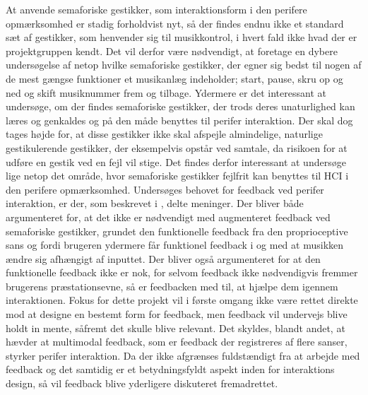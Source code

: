 At anvende semaforiske gestikker, som interaktionsform i den perifere opmærksomhed er stadig forholdvist nyt, så der findes endnu ikke et standard sæt af gestikker, som henvender sig til musikkontrol, i hvert fald ikke hvad der er projektgruppen kendt. Det vil derfor være nødvendigt, at foretage en dybere undersøgelse af netop hvilke semaforiske gestikker, der egner sig bedst til nogen af de mest gængse funktioner et musikanlæg indeholder; start, pause, skru op og ned og skift musiknummer frem og tilbage. Ydermere er det interessant at undersøge, om der findes semaforiske gestikker, der trods deres unaturlighed kan læres og genkaldes og på den måde benyttes til perifer interaktion. Der skal dog tages højde for, at disse gestikker ikke skal afspejle almindelige, naturlige gestikulerende gestikker, der eksempelvis opstår ved samtale, da risikoen for at udføre en gestik ved en fejl vil stige. Det findes derfor interessant at undersøge lige netop det område, hvor semaforiske gestikker fejlfrit kan benyttes til HCI i den perifere opmærksomhed. \blankline
%
Undersøges behovet for feedback ved perifer interaktion, er der, som beskrevet i , delte meninger. Der bliver både argumenteret for, at det ikke er nødvendigt med augmenteret feedback ved semaforiske gestikker, grundet den funktionelle feedback fra den proprioceptive sans og fordi brugeren ydermere får funktionel feedback i og med at musikken ændre sig afhængigt af inputtet. Der bliver også argumenteret for at den funktionelle feedback ikke er nok, for selvom feedback ikke nødvendigvis fremmer brugerens præstationsevne, så er feedbacken med til, at hjælpe dem igennem interaktionen. Fokus for dette projekt vil i første omgang ikke være rettet direkte mod at designe en bestemt form for feedback, men feedback vil undervejs blive holdt in mente, såfremt det skulle blive relevant. Det skyldes, blandt andet, at \textcite[s. 21]{PDF:FacilitatingPIDesignAndEvaluation} hævder at multimodal feedback, som er feedback der registreres af flere sanser, styrker perifer interaktion. Da der ikke afgrænses fuldstændigt fra at arbejde med feedback og det samtidig er et betydningsfyldt aspekt inden for interaktions design, så vil feedback blive yderligere diskuteret fremadrettet.  

